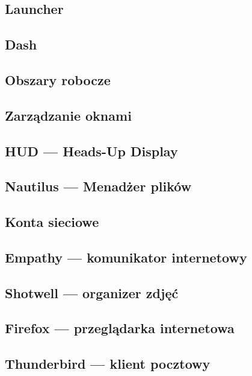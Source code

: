 \documentclass[a4paper,11pt,oneside]{mwart}
\begin{document}
		\subsection{Launcher}
			
		\subsection{Dash}
			
		\subsection{Obszary robocze}
			
		\subsection{Zarządzanie oknami}
			
		\subsection{HUD --- Heads-Up Display}
			
		\subsection{Nautilus --- Menadżer plików}
			
		\subsection{Konta sieciowe}
			
		\subsection{Empathy --- komunikator internetowy}
			
		\subsection{Shotwell --- organizer zdjęć}
			
		\subsection{Firefox --- przeglądarka internetowa}
			
		\subsection{Thunderbird --- klient pocztowy}
			
\end{document}
